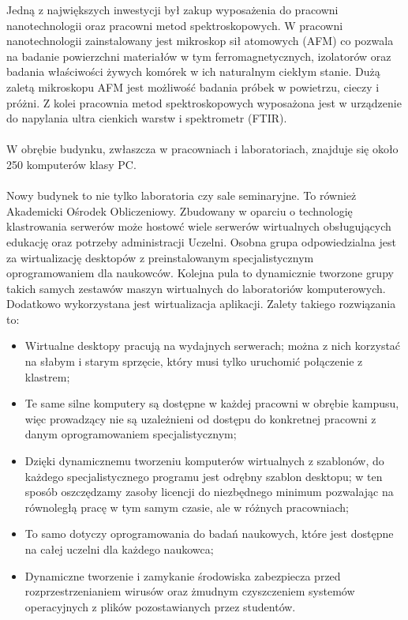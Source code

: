 \documentclass[a4paper,12pt]{article}
\begin{document}
Jedną z największych inwestycji był zakup wyposażenia do pracowni nanotechnologii oraz pracowni metod
spektroskopowych. W pracowni nanotechnologii zainstalowany jest mikroskop sił atomowych (AFM) co
pozwala na badanie powierzchni materiałów w tym ferromagnetycznych, izolatorów oraz badania właściwości
żywych komórek w ich naturalnym ciekłym stanie. Dużą zaletą mikroskopu AFM jest możliwość badania
próbek w powietrzu, cieczy i próżni. Z kolei pracownia metod spektroskopowych wyposażona jest w
urządzenie do napylania ultra cienkich warstw i spektrometr (FTIR).\\\\
W obrębie budynku, zwłaszcza w pracowniach i laboratoriach, znajduje się około 250 komputerów klasy PC.\\\\
Nowy budynek to nie tylko laboratoria czy sale seminaryjne. To również Akademicki Ośrodek Obliczeniowy.
Zbudowany w oparciu o technologię klastrowania serwerów może hostowć wiele serwerów wirtualnych
obsługujących edukację oraz potrzeby administracji Uczelni. Osobna grupa odpowiedzialna jest za
wirtualizację desktopów z preinstalowanym specjalistycznym oprogramowaniem dla naukowców. Kolejna pula
to dynamicznie tworzone grupy takich samych zestawów maszyn wirtualnych do laboratoriów
komputerowych. Dodatkowo wykorzystana jest wirtualizacja aplikacji. Zalety takiego rozwiązania to:
\begin{itemize}
\item Wirtualne desktopy pracują na wydajnych serwerach; można z nich korzystać na słabym i starym
sprzęcie, który musi tylko uruchomić połączenie z klastrem;
\item Te same silne komputery są dostępne w każdej pracowni w obrębie kampusu, więc prowadzący nie są
uzależnieni od dostępu do konkretnej pracowni z danym oprogramowaniem specjalistycznym;
\item Dzięki dynamicznemu tworzeniu komputerów wirtualnych z szablonów, do każdego specjalistycznego
programu jest odrębny szablon desktopu; w ten sposób oszczędzamy zasoby licencji do niezbędnego
minimum pozwalając na równoległą pracę w tym samym czasie, ale w różnych pracowniach;
\item To samo dotyczy oprogramowania do badań naukowych, które jest dostępne na całej uczelni dla każdego
naukowca;
\item Dynamiczne tworzenie i zamykanie środowiska zabezpiecza przed rozprzestrzenianiem wirusów oraz
żmudnym czyszczeniem systemów operacyjnych z plików pozostawianych przez studentów.
\end{itemize}
\end{document}
